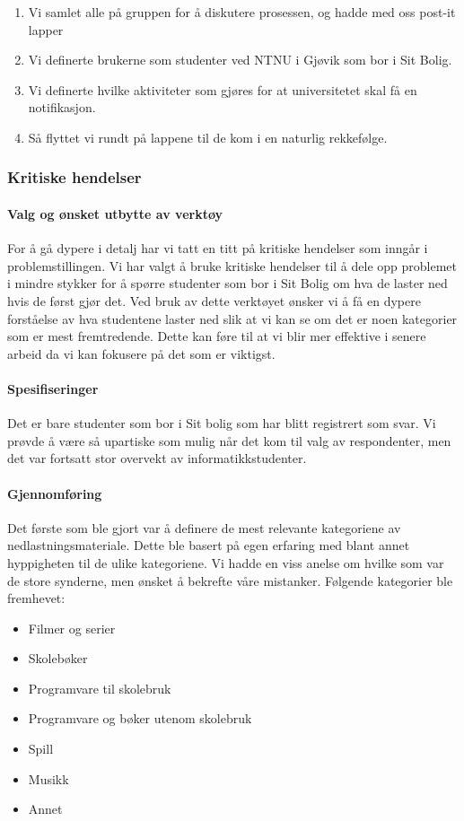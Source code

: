 \begin{enumerate}
    \item Vi samlet alle på gruppen for å diskutere prosessen, og hadde med oss post-it lapper
    \item Vi definerte brukerne som studenter ved NTNU i Gjøvik som bor i Sit Bolig.
    \item Vi definerte hvilke aktiviteter som gjøres for at universitetet skal få en notifikasjon.
    \item Så flyttet vi rundt på lappene til de kom i en naturlig rekkefølge.
\end{enumerate}

\subsubsection{Kritiske hendelser}

\paragraph{Valg og ønsket utbytte av verktøy}
For å gå dypere i detalj har vi tatt en titt på kritiske hendelser som inngår i problemstillingen. Vi har valgt å bruke kritiske hendelser til å dele opp problemet i mindre stykker for å spørre studenter som bor i Sit Bolig om hva de laster ned hvis de først gjør det. Ved bruk av dette verktøyet ønsker vi å få en dypere forståelse av hva studentene laster ned slik at vi kan se om det er noen kategorier som er mest fremtredende. Dette kan føre til at vi blir mer effektive i senere arbeid da vi kan fokusere på det som er viktigst.

\paragraph{Spesifiseringer}
Det er bare studenter som bor i Sit bolig som har blitt registrert som svar. Vi prøvde å være så upartiske som mulig når det kom til valg av respondenter, men det var fortsatt stor overvekt av informatikkstudenter.

\paragraph{Gjennomføring}
Det første som ble gjort var å definere de mest relevante kategoriene av nedlastningsmateriale. Dette ble basert på egen erfaring med blant annet hyppigheten til de ulike kategoriene. Vi hadde en viss anelse om hvilke som var de store synderne, men ønsket å bekrefte våre mistanker. Følgende kategorier ble fremhevet: 
\begin{itemize}
    \item Filmer og serier
    \item Skolebøker
    \item Programvare til skolebruk
    \item Programvare og bøker utenom skolebruk
    \item Spill
    \item Musikk
    \item Annet
\end{itemize}

